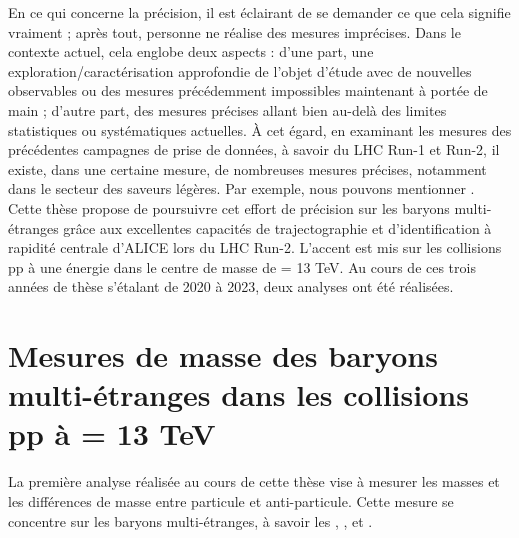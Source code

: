En ce qui concerne la précision, il est éclairant de se demander ce que cela signifie vraiment ; après tout, personne ne réalise des mesures imprécises. Dans le contexte actuel, cela englobe deux aspects : d'une part, une exploration/caractérisation approfondie de l'objet d'étude avec de nouvelles observables ou des mesures précédemment impossibles maintenant à portée de main ; d'autre part, des mesures précises allant bien au-delà des limites statistiques ou systématiques actuelles. À cet égard, en examinant les mesures des précédentes campagnes de prise de données, à savoir du LHC Run-1 et Run-2, il existe, dans une certaine mesure, de nombreuses mesures précises, notamment dans le secteur des saveurs légères. Par exemple, nous pouvons mentionner \cite{alicecollaborationProductionLambdaOverline2023, alicecollaborationMeasurementLifetimeMathrm2023, ciaccoEasuringMuLHC2023, alicecollaborationCharacterizingInitialConditions2022, schotterMultidifferentialInvestigationStrangeness2023, schotterQCDLHC20222022}.\\

Cette thèse propose de poursuivre cet effort de précision sur les baryons multi-étranges grâce aux excellentes capacités de trajectographie et d'identification à rapidité centrale d'ALICE lors du LHC Run-2. L'accent est mis sur les collisions pp à une énergie dans le centre de masse de \sqrtS = 13 TeV. Au cours de ces trois années de thèse s'étalant de 2020 à 2023, deux analyses ont été réalisées.

\chapter{Mesures de masse des baryons multi-étranges dans les collisions pp à \sqrtS = 13 TeV}

La première analyse réalisée au cours de cette thèse vise à mesurer les masses et les différences de masse entre particule et anti-particule. Cette mesure se concentre sur les baryons multi-étranges, à savoir les \rmXiM, \rmAxiP, \rmOmegaM et \rmAomegaP.\\

